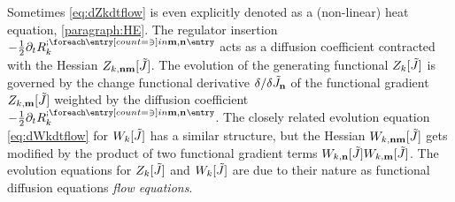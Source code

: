 Sometimes \cref{eq:dZkdtflow} is even explicitly denoted as a (non-linear) heat equation, \cf{} \cref{paragraph:HE}.
The regulator insertion $-\frac{1}{2}\partial_t \FSregulator{\FSidx{m},\FSidx{n}}$ acts as a diffusion coefficient contracted with the Hessian $Z_{k,\textbf{n}\textbf{m}}[\tilde{J}]$.
The \rgtime{} evolution of the generating functional $Z_k[\tilde{J}]$ is governed by the change \dash{} functional derivative $\delta/\delta{\tilde{J}_{\textbf{n}}}$ \dash{} of the functional gradient $Z_{k,\textbf{m}}[\tilde{J}]$ weighted by the diffusion coefficient $-\frac{1}{2}\partial_t \FSregulator{\FSidx{m},\FSidx{n}}$.
The closely related evolution equation \eqref{eq:dWkdtflow} for $W_k[\tilde{J}]$ has a similar structure, but the Hessian $W_{k,\textbf{n}\textbf{m}}[\tilde{J}]$ gets modified by the product of two functional gradient terms $W_{k,\textbf{n}}[\tilde{J}]W_{k,\textbf{m}}[\tilde{J}]$.
The evolution equations for $Z_k[\tilde{J}]$ and $W_k[\tilde{J}]$ are due to their nature as functional diffusion equations \textit{flow equations}.


